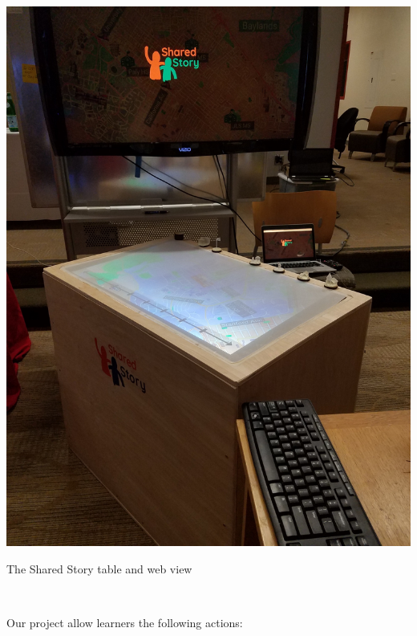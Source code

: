 \documentclass{sigchi-ext}
\begin{document}
\begin{marginfigure}[-14pc]
  \begin{minipage}{\marginparwidth}
    \centering
    \includegraphics[width=0.9\marginparwidth]{figures/table}
    \caption{The Shared Story table and web view}~\label{fig:table}
  \end{minipage}
\end{marginfigure}


Our project allow learners the following actions:
\end{document}
